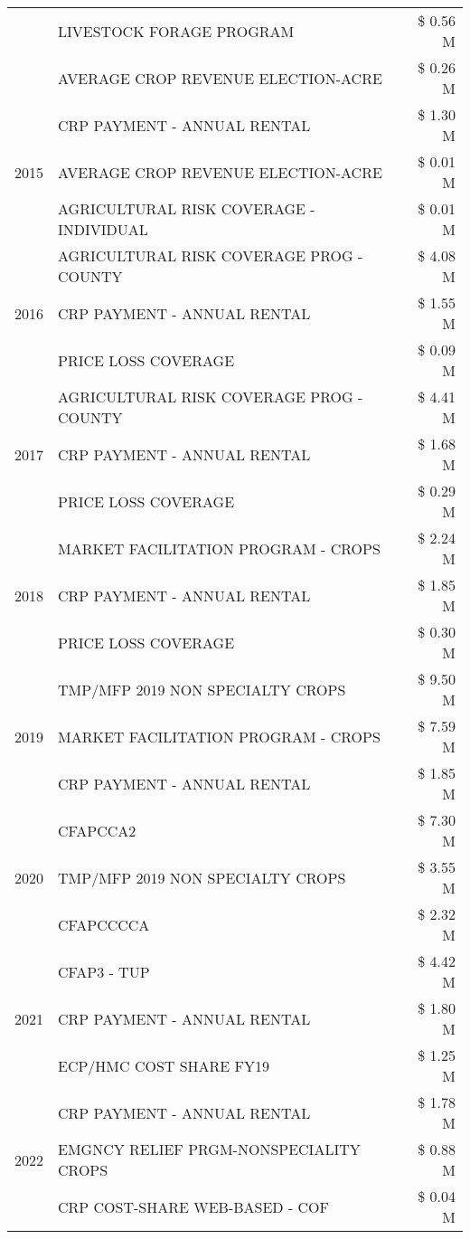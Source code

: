 \begin{tabular}{llr}
 & LIVESTOCK FORAGE PROGRAM & \$ 0.56 M \\
 & AVERAGE CROP REVENUE ELECTION-ACRE & \$ 0.26 M \\
\cline{1-3}
\multirow[t]{3}{*}{2015} & CRP PAYMENT - ANNUAL RENTAL & \$ 1.30 M \\
 & AVERAGE CROP REVENUE ELECTION-ACRE & \$ 0.01 M \\
 & AGRICULTURAL RISK COVERAGE - INDIVIDUAL & \$ 0.01 M \\
\cline{1-3}
\multirow[t]{3}{*}{2016} & AGRICULTURAL RISK COVERAGE PROG - COUNTY & \$ 4.08 M \\
 & CRP PAYMENT - ANNUAL RENTAL & \$ 1.55 M \\
 & PRICE LOSS COVERAGE & \$ 0.09 M \\
\cline{1-3}
\multirow[t]{3}{*}{2017} & AGRICULTURAL RISK COVERAGE PROG - COUNTY & \$ 4.41 M \\
 & CRP PAYMENT - ANNUAL RENTAL & \$ 1.68 M \\
 & PRICE LOSS COVERAGE & \$ 0.29 M \\
\cline{1-3}
\multirow[t]{3}{*}{2018} & MARKET FACILITATION PROGRAM - CROPS & \$ 2.24 M \\
 & CRP PAYMENT - ANNUAL RENTAL & \$ 1.85 M \\
 & PRICE LOSS COVERAGE & \$ 0.30 M \\
\cline{1-3}
\multirow[t]{3}{*}{2019} & TMP/MFP 2019 NON SPECIALTY CROPS & \$ 9.50 M \\
 & MARKET FACILITATION PROGRAM - CROPS & \$ 7.59 M \\
 & CRP PAYMENT - ANNUAL RENTAL & \$ 1.85 M \\
\cline{1-3}
\multirow[t]{3}{*}{2020} & CFAPCCA2 & \$ 7.30 M \\
 & TMP/MFP 2019 NON SPECIALTY CROPS & \$ 3.55 M \\
 & CFAPCCCCA & \$ 2.32 M \\
\cline{1-3}
\multirow[t]{3}{*}{2021} & CFAP3 - TUP & \$ 4.42 M \\
 & CRP PAYMENT - ANNUAL RENTAL & \$ 1.80 M \\
 & ECP/HMC COST SHARE FY19 & \$ 1.25 M \\
\cline{1-3}
\multirow[t]{3}{*}{2022} & CRP PAYMENT - ANNUAL RENTAL & \$ 1.78 M \\
 & EMGNCY RELIEF PRGM-NONSPECIALITY CROPS & \$ 0.88 M \\
 & CRP COST-SHARE WEB-BASED - COF & \$ 0.04 M \\
\cline{1-3}
\bottomrule
\end{tabular}
